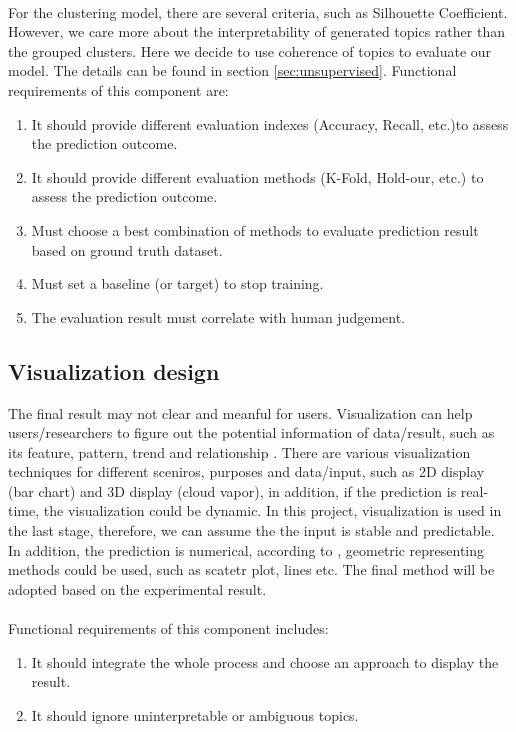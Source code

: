 \\For the clustering model, there are several criteria, such as Silhouette Coefficient. However, we care more about the interpretability of generated topics rather than the grouped clusters. Here we decide to use coherence of topics to evaluate our model. The details can be found in section \ref{sec:unsupervised}.
Functional requirements of this component are:
\begin{enumerate}
    \item It should provide different evaluation indexes (Accuracy, Recall, etc.)to assess the prediction outcome.
    \item It should provide different evaluation methods (K-Fold, Hold-our, etc.) to assess the prediction outcome.
    \item Must choose a best combination of methods to evaluate prediction result based on ground truth dataset.
    \item Must set a baseline (or target) to stop training.
    \item The evaluation result must correlate with human judgement.
\end{enumerate}
\subsection{Visualization design}
The final result may not clear and meanful for users. Visualization can help users/researchers to figure out the potential information of data/result, such as its feature, pattern, trend and relationship \cite{grinstein2002information}. There are various visualization techniques for different sceniros, purposes and data/input, such as 2D display (bar chart) and 3D display (cloud vapor), in addition, if the prediction is real-time, the visualization could be dynamic.  In this project, visualization is used in the last stage, therefore, we can assume the the input is stable and predictable. In addition, the prediction is numerical, according to \cite{grinstein2002information}, geometric representing methods could be used, such as scatetr plot, lines etc. The final method will be adopted based on the experimental result.\\\\
Functional requirements of this component includes:
\begin{enumerate}
    \item It should integrate the whole process and choose an approach to display the result.
    \item It should ignore uninterpretable or ambiguous topics. 
\end{enumerate}
